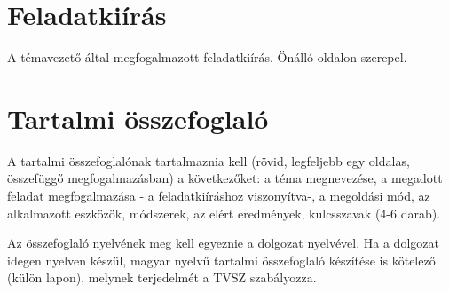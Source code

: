 \documentclass[12pt]{report}
\theoremstyle{definition}
\begin{document}

\tableofcontents




\chapter*{Feladatkiírás}

A témavezető által megfogalmazott feladatkiírás. Önálló oldalon szerepel.



\chapter*{Tartalmi összefoglaló}

A tartalmi összefoglalónak tartalmaznia kell (rövid, legfeljebb egy oldalas, összefüggő megfogalmazásban)
a következőket: a téma megnevezése, a megadott feladat megfogalmazása - a feladatkiíráshoz viszonyítva-,
a megoldási mód, az alkalmazott eszközök, módszerek, az elért eredmények, kulcsszavak (4-6 darab).

Az összefoglaló nyelvének meg kell egyeznie a dolgozat nyelvével. Ha a dolgozat idegen nyelven készül,
magyar nyelvű tartalmi összefoglaló készítése is kötelező (külön lapon), melynek terjedelmét a TVSZ szabályozza.


\end{document}
